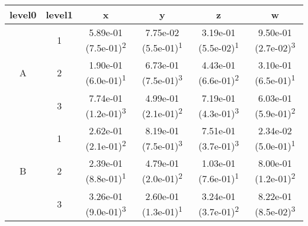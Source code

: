 \begin{tabular}{cccccc}
\toprule
level0 & level1&x&y&z&w\tabularnewline
\midrule
\multirow{3}{*}{A}&1& 5.89e-01 (7.5e-01)\textsuperscript{2}& 7.75e-02 (5.5e-01)\textsuperscript{1}& 3.19e-01 (5.5e-02)\textsuperscript{1}& 9.50e-01 (2.7e-02)\textsuperscript{3}\tabularnewline
&2& 1.90e-01 (6.0e-01)\textsuperscript{1}& 6.73e-01 (7.5e-01)\textsuperscript{3}& 4.43e-01 (6.6e-01)\textsuperscript{2}& 3.10e-01 (6.5e-01)\textsuperscript{1}\tabularnewline
&3& 7.74e-01 (1.2e-01)\textsuperscript{3}& 4.99e-01 (2.1e-01)\textsuperscript{2}& 7.19e-01 (4.3e-01)\textsuperscript{3}& 6.03e-01 (5.9e-01)\textsuperscript{2}\tabularnewline
\midrule
\multirow{3}{*}{B}&1& 2.62e-01 (2.1e-01)\textsuperscript{2}& 8.19e-01 (7.5e-01)\textsuperscript{3}& 7.51e-01 (3.7e-01)\textsuperscript{3}& 2.34e-02 (5.0e-01)\textsuperscript{1}\tabularnewline
&2& 2.39e-01 (8.8e-01)\textsuperscript{1}& 4.79e-01 (2.0e-01)\textsuperscript{2}& 1.03e-01 (7.6e-01)\textsuperscript{1}& 8.00e-01 (1.2e-01)\textsuperscript{2}\tabularnewline
&3& 3.26e-01 (9.0e-01)\textsuperscript{3}& 2.60e-01 (1.3e-01)\textsuperscript{1}& 3.24e-01 (3.7e-01)\textsuperscript{2}& 8.22e-01 (8.5e-02)\textsuperscript{3}\tabularnewline
\bottomrule
\end{tabular}
